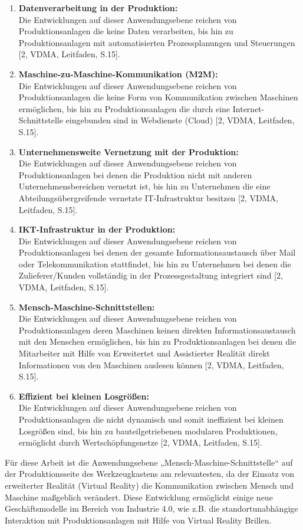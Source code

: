 \begin{enumerate}
	\item \textbf{Datenverarbeitung in der Produktion:} \\ Die Entwicklungen auf dieser Anwendungsebene reichen von Produktionsanlagen die keine Daten verarbeiten, bis hin zu Produktionsanlagen mit automatisierten Prozessplanungen und Steuerungen [2, VDMA, Leitfaden, S.15].
	\item \textbf{Maschine-zu-Maschine-Kommunikation (M2M):} \\ Die Entwicklungen auf dieser Anwendungsebene reichen von Produktionsanlagen die keine Form von Kommunikation zwischen Maschinen ermöglichen, bis hin zu Produktionsanlagen die durch eine Internet-Schnittstelle eingebunden sind in Webdienste (Cloud) [2, VDMA, Leitfaden, S.15].
	\item \textbf{Unternehmensweite Vernetzung mit der Produktion:} \\ Die Entwicklungen auf dieser Anwendungsebene reichen von Produktionsanlagen bei denen die Produktion nicht mit anderen Unternehmensbereichen vernetzt ist, bis hin zu Unternehmen die eine Abteilungsübergreifende vernetzte IT-Infrastruktur besitzen [2, VDMA, Leitfaden, S.15].
	\item \textbf{IKT-Infrastruktur in der Produktion:} \\ Die Entwicklungen auf dieser Anwendungsebene reichen von Produktionsanlagen bei denen der gesamte Informationsaustausch über Mail oder Telekommunikation stattfindet, bis hin zu Unternehmen bei denen die Zulieferer/Kunden vollständig in der Prozessgestaltung integriert sind [2, VDMA, Leitfaden, S.15].
	\item \textbf{Mensch-Maschine-Schnittstellen:} \\ Die Entwicklungen auf dieser Anwendungsebene reichen von Produktionsanlagen deren Maschinen keinen direkten Informationsaustausch mit den Menschen ermöglichen, bis hin zu Produktionsanlagen bei denen die Mitarbeiter mit Hilfe von Erweitertet und Assistierter Realität direkt Informationen von den Maschinen auslesen können [2, VDMA, Leitfaden, S.15].
	\item \textbf{Effizient bei kleinen Losgrößen:} \\ Die Entwicklungen auf dieser Anwendungsebene reichen von Produktionsanlagen die nicht dynamisch und somit ineffizient bei kleinen Losgrößen sind, bis hin zu bauteilgetriebenen modularen Produktionen, ermöglicht durch Wertschöpfungsnetze [2, VDMA, Leitfaden, S.15].
\end{enumerate}
Für diese Arbeit ist die Anwendungsebene „Mensch-Maschine-Schnittstelle“ auf der Produktionsseite des Werkzeugkastens am relevantesten, da der Einsatz von erweiterter Realität (Virtual Reality) die Kommunikation zwischen Mensch und Maschine maßgeblich verändert. Diese Entwicklung ermöglicht einige neue Geschäftsmodelle im Bereich von Industrie 4.0, wie z.B. die standortunabhängige Interaktion mit Produktionsanlagen mit Hilfe von Virtual Reality Brillen.

